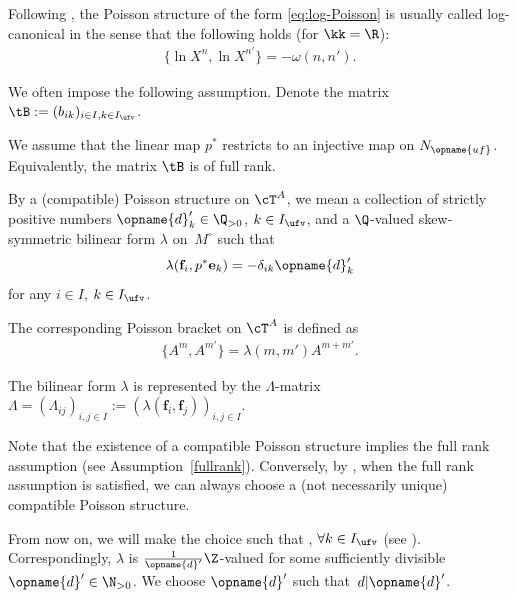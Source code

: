\documentclass[pdftex]{sigma}
\newcommand{\Mc}{M^\circ}
\newcommand{\Nufv}{N_{\opname{uf}}}
\newcommand{\Iufv}{I_{\ufv}}
\renewcommand{\diag}{\opname{d}'}
\newcommand{\ee}{\mathbf{e}}
\newcommand{\ff}{\mathbf{f}}
\numberwithin{equation}{section}
\begin{document}
\begin{Remark}
Following \cite{GekhtmanShapiroVainshtein03,GekhtmanShapiroVainshtein05},
the Poisson structure of the form \eqref{eq:log-Poisson} is usually
called log-canonical in the sense that the following holds (for $\kk=\R$):
\begin{align*}
\big\{\ln X^{n},\ln X^{n'}\big\} =-\omega(n,n').
\end{align*}
\end{Remark}

We often impose the following assumption. Denote the matrix $\tB:=(b_{ik})_{i\in I,k\in\Iufv}$.

\begin{Assumption}\label{fullrank}
We assume that the linear map $p^{*}$ restricts to an injective map
on $\Nufv$. Equivalently, the matrix $\tB$ is of full rank.
\end{Assumption}

\begin{Definition}\label{def:compatible_poisson_A}
By a (compatible) Poisson structure on $\cT^{A}$, we mean a collection
of strictly positive numbers $\diag_{k} \in \Q_{>0}$, $k\in\Iufv$, and a $\Q$-valued
skew-symmetric bilinear form $\lambda$ on~$\Mc$ such that
\begin{gather*}
\lambda(\ff_{i},p^{*}\ee_{k}) = -\delta_{ik}\diag_{k}
\end{gather*}
for any $i\in I$, $k\in\Iufv$.

The corresponding Poisson bracket on $\cT^{A}$ is defined as
\begin{gather*}
\bigl\{A^{m},A^{m'}\bigr\} = \lambda(m,m')A^{m+m'}.
\end{gather*}

The bilinear form $\lambda$ is represented by the $\Lambda$-matrix
$\Lambda=(\Lambda_{ij})_{i,j\in I}:=(\lambda(\ff_{i},\ff_{j}))_{i,j\in I}$.
\end{Definition}

Note that the existence of a compatible Poisson structure implies the full rank assumption (see Assumption~\ref{fullrank}). Conversely, by \cite{GekhtmanShapiroVainshtein03,GekhtmanShapiroVainshtein05},
when the full rank assumption is satisfied, we can always choose a
(not necessarily unique) compatible Poisson structure.

From now on, we will make
the choice such that \smash{$\diag_{k}=\frac{1}{d_{k}}$}, $\forall k\in\Iufv$
(see \cite[Proposition 3.3]{BerensteinZelevinsky05}). Correspondingly, $\lambda$ is $\frac{1}{\diag}\Z$-valued for some sufficiently divisible $\diag\in \N_{>0}$. We choose $\diag$ such that~$d| \diag$.
\end{document}
